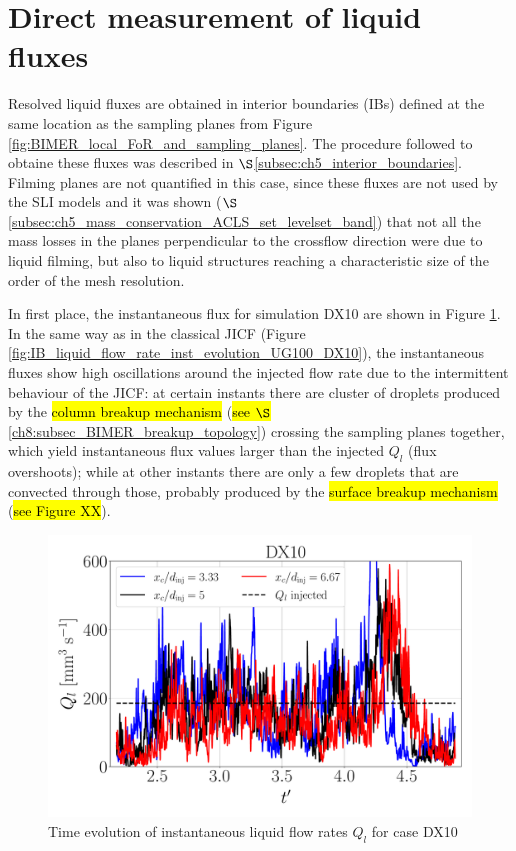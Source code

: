 \clearpage

\section{Direct measurement of liquid fluxes}

Resolved liquid fluxes are obtained in  interior boundaries (IBs) defined at the same location as the sampling planes from Figure \ref{fig:BIMER_local_FoR_and_sampling_planes}. The procedure followed to obtaine these fluxes was described in $\S$\ref{subsec:ch5_interior_boundaries}. Filming planes are not quantified in this case, since these fluxes are not used by the SLI models and it was shown ($\S$\ref{subsec:ch5_mass_conservation_ACLS_set_levelset_band}) that not all the mass losses in the planes perpendicular to the crossflow direction were due to liquid filming, but also to liquid structures reaching a characteristic size of the order of the mesh resolution.

In first place, the instantaneous flux for simulation DX10 are shown in Figure \ref{fig:IB_liquid_flow_rate_inst_evolution_BIMER}. In the same way as in the classical JICF (Figure \ref{fig:IB_liquid_flow_rate_inst_evolution_UG100_DX10}), the instantaneous fluxes show high oscillations around the injected flow rate due to the intermittent behaviour of the JICF: at certain instants there are cluster of droplets produced by the \hl{column breakup mechanism} (\hl{see $\S$}\ref{ch8:subsec_BIMER_breakup_topology}) crossing the sampling planes together, which yield instantaneous flux values larger than the injected $Q_l$ (flux overshoots); while at other instants there are only a few droplets that are convected through those, probably produced by the \hl{surface breakup mechanism} (\hl{see Figure XX}). 




\begin{figure}[ht]
	\centering
   \includegraphics[scale=0.222]{./part3_applications/figures_ch8_resolved/flow_rates_ibs/inst_Q_iso_x_DX10}
   \vspace*{-0.20in}
\caption{Time evolution of instantaneous liquid flow rates $Q_l$ for case DX10}
\label{fig:IB_liquid_flow_rate_inst_evolution_BIMER}
\end{figure}

